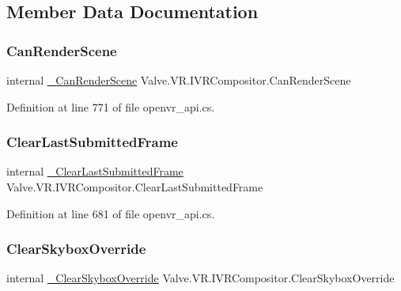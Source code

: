 \subsection{Member Data Documentation}
\mbox{\label{struct_valve_1_1_v_r_1_1_i_v_r_compositor_a2b36be4ce964cca2b015912751c4ae15}} 
\subsubsection{\texorpdfstring{CanRenderScene}{CanRenderScene}}
{\footnotesize\ttfamily internal \mbox{\hyperlink{struct_valve_1_1_v_r_1_1_i_v_r_compositor_a9987f397d90497cfb7dec1feeeab53e4}{\+\_\+\+Can\+Render\+Scene}} Valve.\+V\+R.\+I\+V\+R\+Compositor.\+Can\+Render\+Scene}



Definition at line 771 of file openvr\+\_\+api.\+cs.

\mbox{\label{struct_valve_1_1_v_r_1_1_i_v_r_compositor_a4ccb6191c65b45e6f39671ec913a5620}} 
\subsubsection{\texorpdfstring{ClearLastSubmittedFrame}{ClearLastSubmittedFrame}}
{\footnotesize\ttfamily internal \mbox{\hyperlink{struct_valve_1_1_v_r_1_1_i_v_r_compositor_a24bbc59100ce60397cba42d396d7b51c}{\+\_\+\+Clear\+Last\+Submitted\+Frame}} Valve.\+V\+R.\+I\+V\+R\+Compositor.\+Clear\+Last\+Submitted\+Frame}



Definition at line 681 of file openvr\+\_\+api.\+cs.

\mbox{\label{struct_valve_1_1_v_r_1_1_i_v_r_compositor_a804bbc949f333e29b412119c82a3b713}} 
\subsubsection{\texorpdfstring{ClearSkyboxOverride}{ClearSkyboxOverride}}
{\footnotesize\ttfamily internal \mbox{\hyperlink{struct_valve_1_1_v_r_1_1_i_v_r_compositor_aed1353bac615b802be6754380e30fbf1}{\+\_\+\+Clear\+Skybox\+Override}} Valve.\+V\+R.\+I\+V\+R\+Compositor.\+Clear\+Skybox\+Override}



